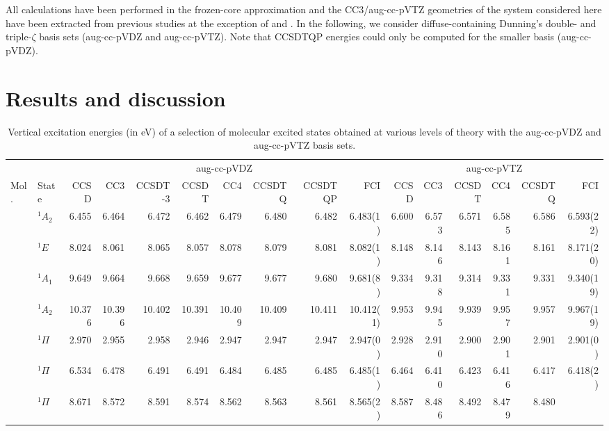 \documentclass[aip,jcp,reprint,noshowkeys,superscriptaddress]{revtex4-1}
\newcommand{\mc}{\multicolumn}
\begin{document}
All calculations have been performed in the frozen-core approximation and the CC3/aug-cc-pVTZ geometries of the system considered here have been extracted from previous studies at the exception of  and .
In the following, we consider diffuse-containing Dunning's double- and triple-$\zeta$ basis sets (aug-cc-pVDZ and aug-cc-pVTZ).
Note that CCSDTQP energies could only be computed for the smaller basis (aug-cc-pVDZ).

\section{Results and discussion}


\begin{squeezetable}
\begin{table*}
	\caption{Vertical excitation energies (in eV) of a selection of molecular excited states obtained at various levels of theory with the aug-cc-pVDZ and aug-cc-pVTZ basis sets.
	\label{tab:BigTab}}
	\begin{ruledtabular}
	\begin{tabular}{llrrrrrrrrrrrrrr}
				&		&	\mc{8}{c}{aug-cc-pVDZ}		&		\mc{6}{c}{aug-cc-pVTZ}		\\	
				\cline{3-10} \cline{11-16}
	Mol.	&	State				&CCSD	&CC3	&CCSDT-3&CCSDT	&CC4	&CCSDTQ	&CCSDTQP	&FCI	
									&CCSD	&CC3	&CCSDT	&CC4	&CCSDTQ	&FCI			\\
	\hline
	\ce{NH3}	&	$^1A_2$ 		&6.455	&6.464	&6.472	&6.462	&6.479	&6.480	&6.482	&6.483(1)	&6.600	&6.573	&6.571	&6.585	&6.586	&6.593(22)	\\	
				&	$^1E$			&8.024	&8.061	&8.065	&8.057	&8.078	&8.079	&8.081	&8.082(1)	&8.148	&8.146	&8.143	&8.161	&8.161	&8.171(20)	\\	
				&	$^1A_1$ 		&9.649	&9.664	&9.668	&9.659	&9.677	&9.677	&9.680	&9.681(8)	&9.334	&9.318	&9.314	&9.331	&9.331	&9.340(19)	\\
				&	$^1A_2$ 		&10.376	&10.396	&10.402	&10.391	&10.409	&10.409	&10.411	&10.412(1)	&9.953	&9.945	&9.939	&9.957	&9.957	&9.967(19)	\\
	\ce{BH}		&	$^1\Pi$ 		&2.970	&2.955	&2.958	&2.946	&2.947	&2.947	&2.947	&2.947(0)	&2.928	&2.910	&2.900	&2.901	&2.901	&2.901(0)	\\
	\ce{BF}		&	$^1\Pi$ 		&6.534	&6.478	&6.491	&6.491	&6.484	&6.485	&6.485	&6.485(1)	&6.464	&6.410	&6.423	&6.416	&6.417	&6.418(2)\\
	\ce{CO}		&	$^1\Pi$ 		&8.671	&8.572	&8.591	&8.574	&8.562	&8.563	&8.561	&8.565(2)	&8.587	&8.486	&8.492	&8.479	&8.480	&	\\

\end{tabular}
\end{ruledtabular}
\end{table*}
\end{squeezetable}
\end{document}

